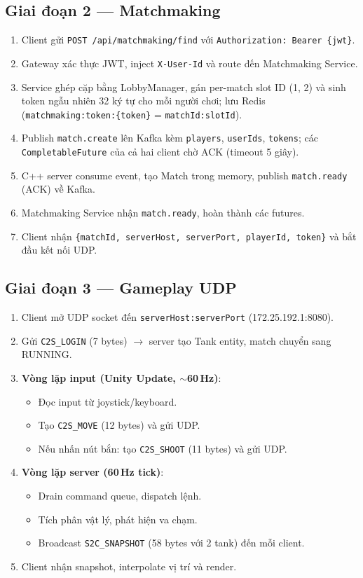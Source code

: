 \documentclass[12pt,a4paper]{report}
\newcommand{\topic}[1]{\texttt{\textcolor{micropurple}{#1}}}
\begin{document}
\subsection{Giai đoạn 2 --- Matchmaking}

\begin{enumerate}
  \item Client gửi \texttt{POST /api/matchmaking/find} với \texttt{Authorization: Bearer \{jwt\}}.
  \item Gateway xác thực JWT, inject \texttt{X-User-Id} và route đến Matchmaking Service.
  \item Service ghép cặp bằng LobbyManager, gán per-match slot ID (1, 2) và sinh token ngẫu nhiên 32 ký tự cho mỗi người chơi; lưu Redis (\texttt{matchmaking:token:\{token\}} = \texttt{matchId:slotId}).
  \item Publish \topic{match.create} lên Kafka kèm \texttt{players}, \texttt{userIds}, \texttt{tokens}; các \texttt{CompletableFuture} của cả hai client chờ ACK (timeout 5 giây).
  \item C++ server consume event, tạo Match trong memory, publish \topic{match.ready} (ACK) về Kafka.
  \item Matchmaking Service nhận \topic{match.ready}, hoàn thành các futures.
  \item Client nhận \texttt{\{matchId, serverHost, serverPort, playerId, token\}} và bắt đầu kết nối UDP.
\end{enumerate}

\subsection{Giai đoạn 3 --- Gameplay UDP}

\begin{enumerate}
  \item Client mở UDP socket đến \texttt{serverHost:serverPort} (172.25.192.1:8080).
  \item Gửi \texttt{C2S\_LOGIN} (7 bytes) $\rightarrow$ server tạo Tank entity, match chuyển sang RUNNING.
  \item \textbf{Vòng lặp input (Unity Update, $\sim$60\,Hz)}:
    \begin{itemize}
      \item Đọc input từ joystick/keyboard.
      \item Tạo \texttt{C2S\_MOVE} (12 bytes) và gửi UDP.
      \item Nếu nhấn nút bắn: tạo \texttt{C2S\_SHOOT} (11 bytes) và gửi UDP.
    \end{itemize}
  \item \textbf{Vòng lặp server (60\,Hz tick)}:
    \begin{itemize}
      \item Drain command queue, dispatch lệnh.
      \item Tích phân vật lý, phát hiện va chạm.
      \item Broadcast \texttt{S2C\_SNAPSHOT} (58 bytes với 2 tank) đến mỗi client.
    \end{itemize}
  \item Client nhận snapshot, interpolate vị trí và render.
\end{enumerate}
\end{document}
